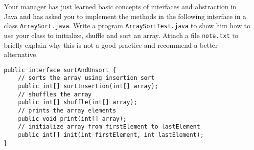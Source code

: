 Your manager has just learned basic concepts of interfaces and abstraction in Java and has asked you to implement the methods in the following interface in a class \texttt{ArraySort.java}. Write a program \texttt{ArraySortTest.java} to show him how to use your class to initialize, shuffle and sort an array. Attach a file \texttt{note.txt} to briefly explain why this is not a good practice and recommend a better alternative.

\lstset{language=java}
\begin{lstlisting}
public interface sortAndUnsort {
	// sorts the array using insertion sort
	public int[] sortInsertion(int[] array);
	// shuffles the array
	public int[] shuffle(int[] array);
	// prints the array elements
	public void print(int[] array);
	// initialize array from firstElement to lastElement
	public int[] init(int firstElement, int lastElement);
}
\end{lstlisting}
